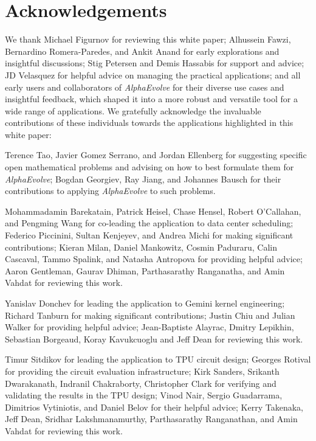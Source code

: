 \documentclass[logo,copyright,12pt]{googledeepmind}
\theoremstyle{definition}
\theoremstyle{remark}
\theoremstyle{plain}
\newcommand{\method}{\emph{AlphaEvolve}\xspace}
\begin{document}



\section*{Acknowledgements}
\label{sec:acknowledgements}

We thank  Michael Figurnov for reviewing this white paper; Alhussein Fawzi, Bernardino Romera-Paredes, and Ankit Anand for early explorations and insightful discussions; Stig Petersen and Demis Hassabis for support and advice;  JD Velasquez for helpful advice on managing the practical applications; and all early users and collaborators of \method for their diverse use cases and insightful feedback, which shaped it into a more robust and versatile tool for a wide range of applications. We gratefully acknowledge the invaluable contributions of these individuals towards the applications highlighted in this white paper:

Terence Tao, Javier Gomez Serrano, and Jordan Ellenberg for suggesting specific open mathematical problems and advising on how to best formulate them for \method; Bogdan Georgiev, Ray Jiang, and Johannes Bausch for their contributions to applying \method to such problems.

Mohammadamin Barekatain, Patrick Heisel, Chase Hensel, Robert O'Callahan, and Pengming Wang for co-leading the application to data center scheduling; Federico Piccinini, Sultan Kenjeyev, and Andrea Michi for making significant contributions; Kieran Milan, Daniel Mankowitz, Cosmin Paduraru, Calin Cascaval, Tammo Spalink, and Natasha Antropova for providing helpful advice; Aaron Gentleman, Gaurav Dhiman, Parthasarathy Ranganatha, and Amin Vahdat for reviewing this work.

Yanislav Donchev for leading the application to Gemini kernel engineering; Richard Tanburn for making significant contributions; Justin Chiu and Julian Walker for providing helpful advice; Jean-Baptiste Alayrac, Dmitry Lepikhin, Sebastian Borgeaud, Koray Kavukcuoglu and Jeff Dean for reviewing this work.

Timur Sitdikov for leading the application to TPU circuit design; Georges Rotival for providing the circuit evaluation infrastructure; Kirk Sanders, Srikanth Dwarakanath, Indranil Chakraborty, Christopher Clark for verifying and validating the results in the TPU design; Vinod Nair, Sergio Guadarrama, Dimitrios Vytiniotis, and Daniel Belov for their helpful advice; Kerry Takenaka, Jeff Dean, Sridhar Lakshmanamurthy, Parthasarathy Ranganathan, and Amin Vahdat for reviewing this work.
\end{document}
